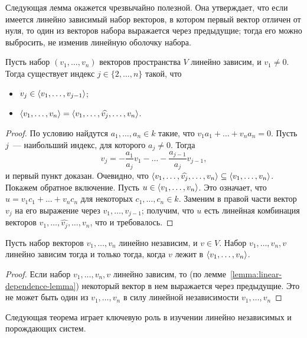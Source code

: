 Следующая лемма окажется чрезвычайно полезной. Она утверждает, что если
имеется линейно зависимый набор векторов, в котором первый вектор отличен
от нуля, то один из векторов набора выражается через предыдущие;
тогда его можно выбросить, не изменив линейную оболочку набора.

\begin{lemma}\label{lemma:linear-dependence-lemma}
Пусть набор $(v_1,\dots,v_n)$ векторов пространства $V$ линейно зависим, и
$v_1\neq 0$. Тогда существует индекс $j\in\{2,\dots,n\}$ такой, что
\begin{itemize}
\item $v_j\in\langle v_1,\dots,v_{j-1}\rangle$;
\item $\langle v_1,\dots,v_n\rangle = \langle v_1,\dots,\widehat{v_j},\dots,v_n\rangle$.
\end{itemize}
\end{lemma}
\begin{proof}
По условию найдутся $a_1,\dots,a_n\in k$ такие, что
$v_1a_1+\dots+v_na_n = 0$.
Пусть $j$~--- наибольший индекс, для которого $a_j\neq 0$.
Тогда
$$
v_j = - \frac{a_1}{a_j}v_1 - \dots - \frac{a_{j-1}}{a_j}v_{j-1},
$$
и первый пункт доказан. Очевидно, что
$\langle v_1,\dots,\widehat{v_j},\dots,v_n\rangle\subseteq\langle v_1,\dots,v_n\rangle$.
Покажем обратное включение. Пусть $u\in \langle v_1,\dots,v_n\rangle$. 
Это означает, что $u = v_1c_1 + \dots + v_nc_n$ для некоторых
$c_1,\dots,c_n\in k$. Заменим в правой части
вектор $v_j$ на его выражение через $v_1,\dots,v_{j-1}$; получим,
что $u$ есть линейная комбинация векторов $v_1,\dots,\widehat{v_j},\dots,v_n$,
что и требовалось.
\end{proof}

\begin{corollary}\label{cor:lnz-becomes-lz}
Пусть набор векторов $v_1,\dots,v_n$ линейно независим, и $v\in V$.
Набор $v_1,\dots,v_n,v$ линейно зависим тогда и только тогда,
когда $v$ лежит в $\langle v_1,\dots,v_n\rangle$.
\end{corollary}
\begin{proof}
Если набор $v_1,\dots,v_n,v$ линейно зависим, то
(по лемме~\ref{lemma:linear-dependence-lemma}) некоторый вектор в нем
выражается через предыдущие. Это не может быть один из $v_1,\dots,v_n$
в силу линейной независимости $v_1,\dots,v_n$
\end{proof}

Следующая теорема играет ключевую роль в изучении линейно независимых
и порождающих систем. 

